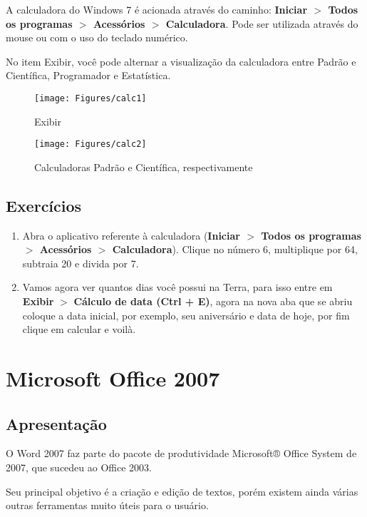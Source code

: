 \documentclass[hidelinks,12pt]{article}
\begin{document}
			A calculadora do Windows 7 é acionada através do caminho: {\bf Iniciar $>$ Todos os programas $>$ Acessórios $>$ Calculadora}. Pode ser utilizada através do mouse ou com o uso do teclado numérico.
			
			No item Exibir, você pode alternar a visualização da calculadora entre Padrão e Científica, Programador e Estatística.	
			
			\begin{figure}[!h]
				\centering
				\texttt{[image: Figures/calc1]}
				\label{fig:calc1}
				\caption{Exibir}
			\end{figure}
			
			\begin{figure}[!h]
				\centering
				\texttt{[image: Figures/calc2]}
				\label{fig:calc2}
				\caption{Calculadoras Padrão e Científica, respectivamente}
			\end{figure}
			
		\subsection{Exercícios}
			
		\begin{enumerate}
			\item Abra o aplicativo referente à calculadora ({\bf Iniciar $>$ Todos os programas $>$ Acessórios $>$ Calculadora}). Clique no número 6, multiplique por 64, subtraia 20 e divida por 7.
			
			\item Vamos agora ver quantos dias você possui na Terra, para isso entre em \textbf{Exibir} $>$ \textbf{Cálculo de data (Ctrl + E)}, agora na nova aba que se abriu coloque a data inicial, por exemplo, seu aniversário e data de hoje, por fim clique em calcular e voilà.
		\end{enumerate}
			
	\section{Microsoft Office 2007}
	
	\subsection{Apresentação}
	
	O Word 2007 faz parte do pacote de produtividade Microsoft® Office System de 2007, que sucedeu ao Office 2003.

	Seu principal objetivo é a criação e edição de textos, porém existem ainda várias outras ferramentas muito úteis para o usuário.
		
\end{document}
